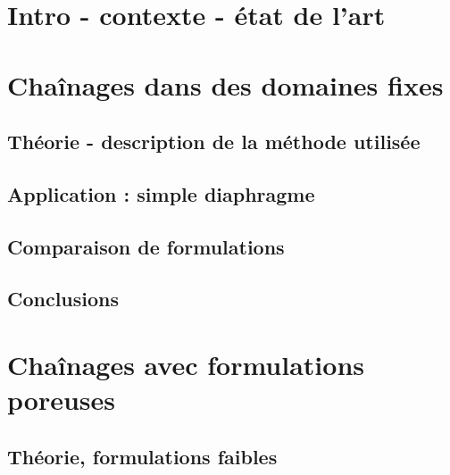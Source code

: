 

\chapter{Intro - contexte - état de l'art}
    



\chapter{Chaînages dans des domaines fixes}
    \label{section:chapDiaphragme}
     
    \section{Théorie - description de la méthode utilisée}
        
    \section{Application : simple diaphragme}
        
    \section{Comparaison de formulations}
        
    \section{Conclusions}
        

\chapter{Chaînages avec formulations poreuses}
    \label{section:chapPoreux}
    
    \section{Théorie, formulations faibles}
            
